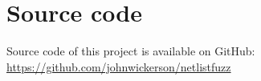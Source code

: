 \renewcommand{\baselinestretch}{1.5}
\chapter{Source code}
\label{App:source code}

Source code of this project is available on GitHub:\\
\url{https://github.com/johnwickerson/netlistfuzz}